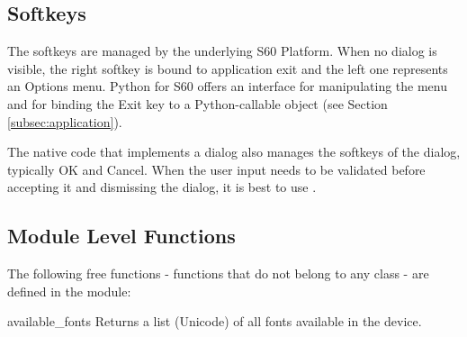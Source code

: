 \subsection{Softkeys}
\label{subsec:softkeys}
The softkeys are managed by the underlying S60 Platform. When no
dialog is visible, the right softkey is bound to application exit and
the left one represents an Options menu. Python for S60 offers
an interface for manipulating the menu and for binding the Exit key to
a Python-callable object (see Section \ref{subsec:application}). 

The native code that implements a dialog also manages the softkeys of the 
dialog, typically OK and Cancel. When the user input needs to be validated 
before accepting it and dismissing the dialog, it is best to use 
.

\subsection{Module Level Functions}
\label{subsec:module}
The following free functions - functions that do not belong to any class 
- are defined in the  module:

\begin{funcdesc}{available_fonts}{}
Returns a list (Unicode) of all fonts available in the device.
\end{funcdesc}

